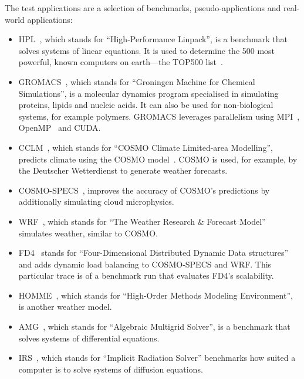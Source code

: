 \documentclass[a4paper, final, diplominf]{zih-template}
\begin{document}
The test applications are a selection of benchmarks, pseudo-applications and real-world applications:
\begin{itemize}
	\item HPL~\cite{hpl}, which stands for ``High-Performance Linpack'', is a benchmark that solves systems of linear equations.
		It is used to determine the 500 most powerful, known computers on earth---the TOP500 list~\cite{top500}.\vspace{-0.5ex}
	\item GROMACS~\cite{gromacs, van05}, which stands for ``Groningen Machine for Chemical Simulations'', is a molecular dynamics program specialised in simulating proteins, lipids and nucleic acids.
		It can also be used for non-biological systems, for example polymers.
		GROMACS leverages parallelism using MPI~\cite{mpi}, OpenMP~\cite{openmp} and CUDA.\vspace{-0.5ex}
	\item CCLM~\cite{rockel08}, which stands for ``COSMO Climate Limited-area Modelling'', predicts climate using the COSMO model~\cite{cosmo}.
		COSMO is used, for example, by the Deutscher Wetterdienst to generate weather forecasts.\vspace{-0.5ex}
	\item COSMO-SPECS~\cite{gruetzun08}, improves the accuracy of COSMO's predictions by additionally simulating cloud microphysics.\vspace{-0.5ex}
	\item WRF~\cite{michalakes01, wrf}, which stands for ``The Weather Research \& Forecast Model'' simulates weather, similar to COSMO.\vspace{-0.5ex}
	\item FD4~\cite{lieber, lieber09} stands for ``Four-Dimensional Distributed Dynamic Data structures'' and adds dynamic load balancing to COSMO-SPECS and WRF.
		This particular trace is of a benchmark run that evaluates FD4's scalability.\vspace{-0.5ex}
	\item HOMME~\cite{homme}, which stands for ``High-Order Methods Modeling Environment'', is another weather model.\vspace{-0.5ex}
	\item AMG~\cite{amg}, which stands for ``Algebraic Multigrid Solver'', is a benchmark that solves systems of differential equations.\vspace{-0.5ex}
	\item IRS~\cite{irs}, which stands for ``Implicit Radiation Solver'' benchmarks how suited a computer is to solve systems of diffusion equations.

\end{itemize}
\end{document}
